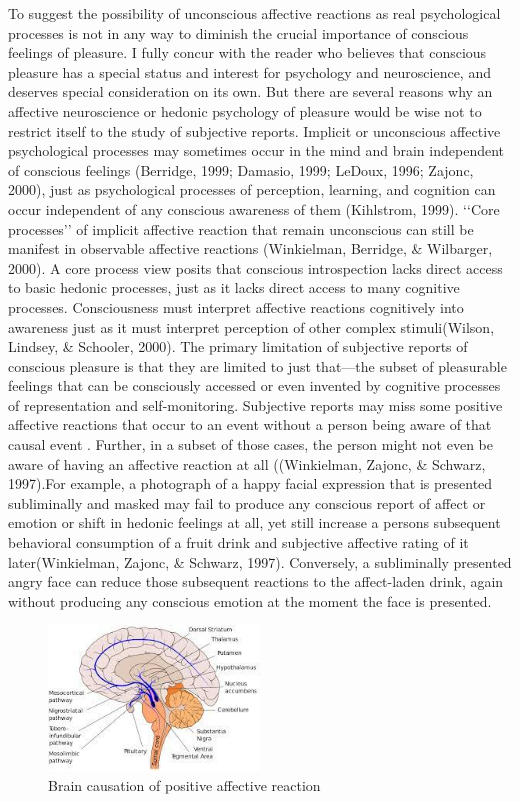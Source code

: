 \documentclass[conference]{IEEEtran}
\begin{document}
To suggest the possibility of unconscious affective
reactions as real psychological processes is not in any
way to diminish the crucial importance of conscious
feelings of pleasure. I fully concur with the reader who
believes that conscious pleasure has a special status and
interest for psychology and neuroscience, and deserves
special consideration on its own. But there are several
reasons why an affective neuroscience or hedonic psychology of pleasure would be wise not to restrict itself to
the study of subjective reports.
Implicit or unconscious affective psychological processes may sometimes occur in the mind and brain independent of conscious feelings (Berridge, 1999;
Damasio, 1999; LeDoux, 1996; Zajonc, 2000), just as
psychological processes of perception, learning, and
cognition can occur independent of any conscious
awareness of them (Kihlstrom, 1999). ‘‘Core processes’’
of implicit affective reaction that remain unconscious
can still be manifest in observable affective reactions
(Winkielman, Berridge, \& Wilbarger, 2000).
A core process view posits that conscious introspection lacks direct access to basic hedonic processes, just
as it lacks direct access to many cognitive processes.
Consciousness must interpret affective reactions cognitively into awareness just as it must interpret perception of other complex stimuli(Wilson, Lindsey, \& Schooler, 2000). The primary limitation of subjective reports of conscious pleasure is that they are
limited to just that—the subset of pleasurable feelings
that can be consciously accessed or even invented by
cognitive processes of representation and self-monitoring. Subjective reports may miss some positive affective
reactions that occur to an event without a person being
aware of that causal event . Further, in
a subset of those cases, the person might not even be
aware of having an affective reaction at all ((Winkielman, Zajonc, \& Schwarz, 1997).For example, a photograph of a happy facial expression that is presented
subliminally and masked may fail to produce any conscious report of affect or emotion or shift in hedonic
feelings at all, yet still increase a persons subsequent
behavioral consumption of a fruit drink and subjective
affective rating of it later(Winkielman, Zajonc, \& Schwarz, 1997). Conversely, a subliminally
presented angry face can reduce those subsequent reactions to the affect-laden drink, again without producing
any conscious emotion at the moment the face is
presented.
\begin{figure}[h]
  \centering
  \includegraphics[width=0.5\textwidth]{pic-6.jpeg}
  \caption{Brain causation of positive affective reaction}
  \label{fig:example}
\end{figure}
\end{document}
